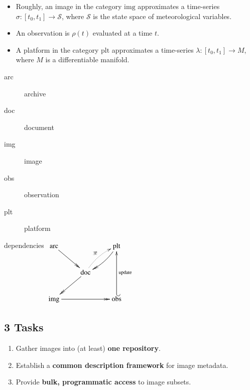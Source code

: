 \documentclass{beamer}
\begin{document}
\begin{frame}
    \begin{itemize}
    \item Roughly, an image in the category $\text{img}$ approximates a time-series $\sigma \colon [t_0, t_1] \to \mathscr{S}$, where $\mathscr{S}$ is the state space of meteorological variables. 

    \item An observation is $\rho(t)$ evaluated at a time $t$.

    \item A platform in the category $\text{plt}$ approximates a time-series $\lambda \colon [t_0, t_1] \to M$, where $M$ is a differentiable manifold.
    \end{itemize}

    \begin{minipage}[t]{0.45\linewidth}
        \begin{description}
            \item[arc] archive
            \item[doc] document
            \item[img] image
            \item[obs] observation
            \item[plt] platform
        \end{description}
    \end{minipage}
    \begin{minipage}[t]{0.40\linewidth}
        \begin{block}{dependencies}
            $\xymatrix{
                \text{arc} \ar@{->>}[dr] &  & \ar@{->>}@/^5px/[dl] \text{plt} \\
                & \text{doc} \ar@{.>}@/^5px/[ur]^{\exists!} \ar@{->>}[dl] & \\
                \text{img} \ar@{->>}[rr] & & \text{obs} \ar@{_{(}->}[uu]_{\text{update}}}$
        \end{block}
    \end{minipage}
\end{frame}

\subsection{3 Tasks}

\begin{frame}
    \begin{enumerate}
        \item Gather images into (at least) \textbf{one repository}. 
        \item Establish a \textbf{common description framework} for image metadata.
        \item Provide \textbf{bulk, programmatic access} to image subsets.
    \end{enumerate}
\end{frame}
\end{document}
